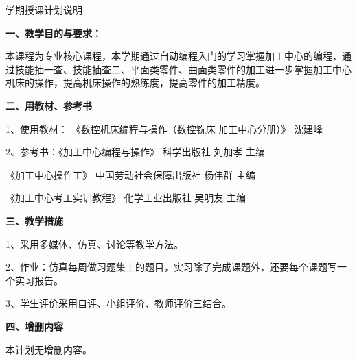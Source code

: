 \documentclass{ctexart}
\begin{document}
\kh{[3]} %

\jhsy %

\begin{center}
 \heiti 学期授课计划说明
\end{center}
 \setlength{\parindent}{2em} \setlength{\baselineskip}{22pt}

\textbf{一、教学目的与要求：}

本课程为专业核心课程，本学期通过自动编程入门的学习掌握加工中心的编程，通过技能抽一查、技能抽查二、平面类零件、曲面类零件的加工进一步掌握加工中心机床的操作，提高机床操作的熟练度，提高零件的加工精度。

\textbf{二、用教材、参考书}

1、使用教材： 《数控机床编程与操作（数控铣床 加工中心分册）》 沈建峰

2、参考书：《加工中心编程与操作》  科学出版社  刘加孝   主编

\hspace{5em}《加工中心操作工》 中国劳动社会保障出版社  杨伟群  主编

\hspace{5em}《加工中心考工实训教程》  化学工业出版社   吴明友 主编

\textbf{三、教学措施}

1、采用多媒体、仿真、讨论等教学方法。

2、作业：仿真每周做习题集上的题目，实习除了完成课题外，还要每个课题写一个实习报告。

3、学生评价采用自评、小组评价、教师评价三结合。


\textbf{四、增删内容}

本计划无增删内容。
\end{document}
